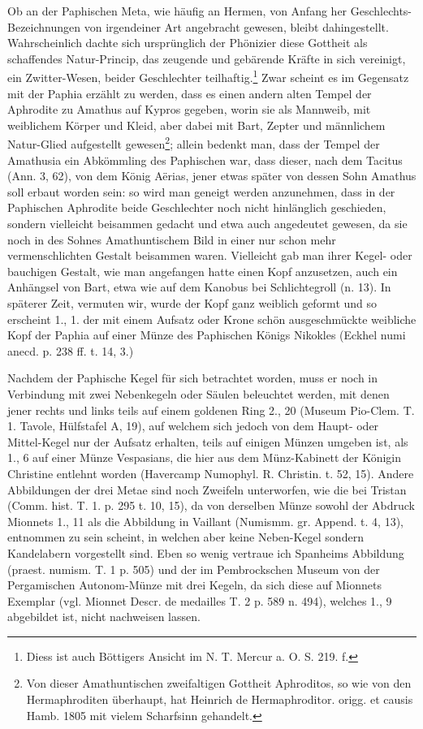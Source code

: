 \documentclass[a4paper, 11pt, oneside, polutonikogreek, german]{article}
\begin{document}
Ob an der Paphischen Meta, wie häufig an Hermen, von Anfang her Geschlechts-Bezeichnungen von irgendeiner Art angebracht gewesen, bleibt dahingestellt. Wahrscheinlich dachte sich ursprünglich der Phönizier diese Gottheit als schaffendes Natur-Princip, das zeugende und gebärende Kräfte in sich vereinigt, ein Zwitter-Wesen, beider Geschlechter teilhaftig.\footnote{Diess ist auch Böttigers Ansicht im N. T. Mercur a. O. S. 219. f.} Zwar scheint es im Gegensatz mit der Paphia erzählt zu werden, dass es einen andern alten Tempel der Aphrodite zu Amathus auf Kypros gegeben, worin sie als Mannweib, mit weiblichem Körper und Kleid, aber dabei mit Bart, Zepter und männlichem Natur-Glied aufgestellt gewesen\footnote{Von dieser Amathuntischen zweifaltigen Gottheit Aphroditos, so wie von den Hermaphroditen überhaupt, hat Heinrich de Hermaphroditor. origg. et causis Hamb. 1805 mit vielem Scharfsinn gehandelt.}; allein bedenkt man, dass der Tempel der Amathusia ein Abkömmling des Paphischen war, dass dieser, nach dem Tacitus (Ann. 3, 62), von dem König Aërias, jener etwas später von dessen Sohn Amathus soll erbaut worden sein: so wird man geneigt werden anzunehmen, dass in der Paphischen Aphrodite beide Geschlechter noch nicht hinlänglich geschieden, sondern vielleicht beisammen gedacht und etwa auch angedeutet gewesen, da sie noch in des Sohnes Amathuntischem Bild in einer nur schon mehr vermenschlichten Gestalt beisammen waren. Vielleicht gab man ihrer Kegel- oder bauchigen Gestalt, wie man angefangen hatte einen Kopf anzusetzen, auch ein Anhängsel von Bart, etwa wie auf dem Kanobus bei Schlichtegroll (n. 13). In späterer Zeit, vermuten wir, wurde der Kopf ganz weiblich geformt und so erscheint 1., 1. der mit einem Aufsatz oder Krone schön ausgeschmückte weibliche Kopf der Paphia auf einer Münze des Paphischen Königs Nikokles (Eckhel numi anecd. p. 238 ff. t. 14, 3.)

Nachdem der Paphische Kegel für sich betrachtet worden, muss er noch in Verbindung mit zwei Nebenkegeln oder Säulen beleuchtet werden, mit denen jener rechts und links teils auf einem goldenen Ring 2., 20 (Museum Pio-Clem. T. 1. Tavole, Hülfstafel A, 19), auf welchem sich jedoch von dem Haupt- oder Mittel-Kegel nur der Aufsatz erhalten, teils auf einigen Münzen umgeben ist, als 1., 6 auf einer Münze Vespasians, die hier aus dem Münz-Kabinett der Königin Christine entlehnt worden (Havercamp Numophyl. R. Christin. t. 52, 15). Andere Abbildungen der drei Metae sind noch Zweifeln unterworfen, wie die bei Tristan (Comm. hist. T. 1. p. 295 t. 10, 15), da von derselben Münze sowohl der Abdruck Mionnets 1., 11 als die Abbildung in Vaillant (Numismm. gr. Append. t. 4, 13), entnommen zu sein scheint, in welchen aber keine Neben-Kegel sondern Kandelabern vorgestellt sind. Eben so wenig vertraue ich Spanheims Abbildung (praest. numism. T. 1 p. 505) und der im Pembrockschen Museum von der Pergamischen Autonom-Münze mit drei Kegeln, da sich diese auf Mionnets Exemplar (vgl. Mionnet Descr. de medailles T. 2 p. 589 n. 494), welches 1., 9 abgebildet ist, nicht nachweisen lassen.
\end{document}
